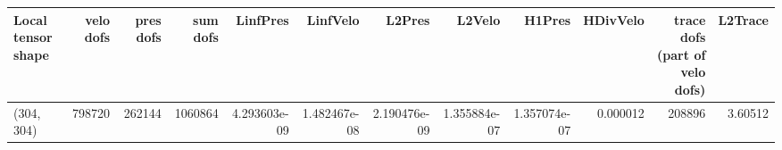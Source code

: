 \begin{tabular}{lrrrrrrrrrrr}
\toprule
Local tensor shape &  velo dofs &  pres dofs &  sum dofs &     LinfPres &     LinfVelo &       L2Pres &       L2Velo &       H1Pres &  HDivVelo &  trace dofs (part of velo dofs) &  L2Trace \\
\midrule
        (304, 304) &     798720 &     262144 &   1060864 & 4.293603e-09 & 1.482467e-08 & 2.190476e-09 & 1.355884e-07 & 1.357074e-07 &  0.000012 &                          208896 &  3.60512 \\
\bottomrule
\end{tabular}
